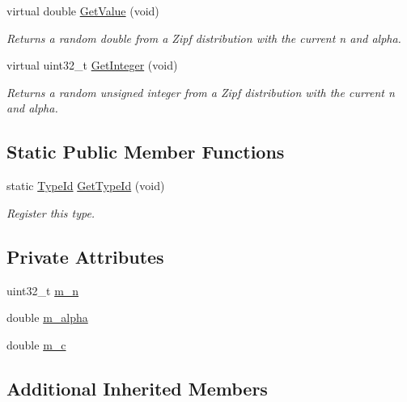 \begin{DoxyCompactItemize}
virtual double \hyperlink{classns3_1_1ZipfRandomVariable_a3a1a48eed27e3d693bf28c2800d7eab1}{Get\+Value} (void)
\begin{DoxyCompactList}\small\item\em Returns a random double from a Zipf distribution with the current n and alpha. \end{DoxyCompactList}\item 
virtual uint32\+\_\+t \hyperlink{classns3_1_1ZipfRandomVariable_adda8cb5e7c55aad89f0d704b5d4cb9bc}{Get\+Integer} (void)
\begin{DoxyCompactList}\small\item\em Returns a random unsigned integer from a Zipf distribution with the current n and alpha. \end{DoxyCompactList}\end{DoxyCompactItemize}
\subsection*{Static Public Member Functions}
\begin{DoxyCompactItemize}
\item 
static \hyperlink{classns3_1_1TypeId}{Type\+Id} \hyperlink{classns3_1_1ZipfRandomVariable_ace1382ab4418489bcdbfb47cf55744eb}{Get\+Type\+Id} (void)
\begin{DoxyCompactList}\small\item\em Register this type. \end{DoxyCompactList}\end{DoxyCompactItemize}
\subsection*{Private Attributes}
\begin{DoxyCompactItemize}
\item 
uint32\+\_\+t \hyperlink{classns3_1_1ZipfRandomVariable_ab8a445c68948057e97c1c95f6f684c73}{m\+\_\+n}
\item 
double \hyperlink{classns3_1_1ZipfRandomVariable_a9583e78be81f0ef5a46d9893dcec5556}{m\+\_\+alpha}
\item 
double \hyperlink{classns3_1_1ZipfRandomVariable_a4e5d128f53e226f84340471095380ab0}{m\+\_\+c}
\end{DoxyCompactItemize}
\subsection*{Additional Inherited Members}


